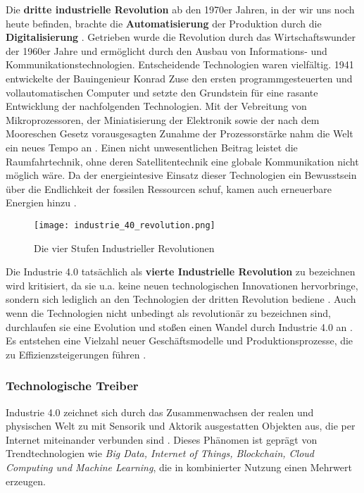 Die \textbf{dritte industrielle Revolution} ab den 1970er Jahren, in der wir uns noch heute befinden,  brachte die \textbf{Automatisierung} der Produktion durch die \textbf{Digitalisierung} \citep{Voigt2018}. Getrieben wurde die Revolution durch das Wirtschaftswunder der 1960er Jahre \citep{Roth2016} und ermöglicht durch den Ausbau von Informations- und Kommunikationstechnologien. Entscheidende Technologien waren vielfältig. 1941 entwickelte der Bauingenieur Konrad Zuse den ersten programmgesteuerten und vollautomatischen Computer und setzte den Grundstein für eine rasante Entwicklung der nachfolgenden Technologien. Mit der Vebreitung von Mikroprozessoren, der Miniatisierung der Elektronik sowie der nach dem Mooreschen Gesetz vorausgesagten Zunahme der Prozessorstärke nahm die Welt ein neues Tempo an \citep{Sendler2016}. Einen nicht unwesentlichen Beitrag leistet die Raumfahrtechnik, ohne deren Satellitentechnik eine globale Kommunikation nicht möglich wäre. Da der energieintesive Einsatz dieser Technologien ein Bewusstsein über die Endlichkeit der fossilen Ressourcen schuf, kamen auch erneuerbare Energien hinzu \citep{Barthelmaes2017}.

\begin{figure}[ht]
  \centering
  \texttt{[image: industrie\_40\_revolution.png]}
  \caption[Die vier Stufen Industrieller Revolutionen]{Die vier Stufen Industrieller Revolutionen\citep{Bauer2015}}
  \label{fig:revolutions}
\end{figure}

Die Industrie 4.0 tatsächlich als \textbf{vierte Industrielle Revolution} zu bezeichnen wird kritisiert, da sie u.a. keine neuen technologischen Innovationen hervorbringe, sondern sich lediglich an den Technologien der dritten Revolution bediene \citep{Barthelmaes2017}. Auch wenn die Technologien nicht unbedingt als revolutionär zu bezeichnen sind, durchlaufen sie eine Evolution und stoßen einen Wandel durch Industrie 4.0 an \citep{Roth2016}. Es entstehen eine Vielzahl neuer Geschäftsmodelle und Produktionsprozesse, die zu Effizienzsteigerungen führen \citep{BITKOM2015}.


\subsubsection{Technologische Treiber}

Industrie 4.0 zeichnet sich durch das Zusammenwachsen der realen und physischen Welt zu mit Sensorik und Aktorik ausgestatten Objekten aus, die per Internet miteinander verbunden sind \citep{BITKOM2015}. Dieses Phänomen ist geprägt von Trendtechnologien wie \textit{Big Data, Internet of Things, Blockchain, Cloud Computing und Machine Learning}, die in kombinierter Nutzung einen Mehrwert erzeugen.
